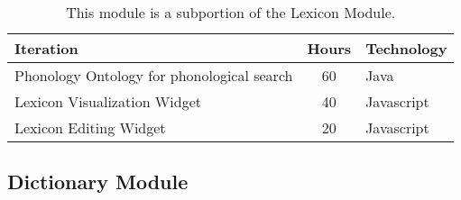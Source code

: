 \documentclass[12 pt]{article}
\begin{document}
\footnotesize
\begin{table}[htbp]
\begin{center}
  \begin{tabular}{ | lcl | }
\hline
Iteration&	Hours&	Technology	\\
\hline
Phonology Ontology for phonological search&	60&	Java	\\ 
Lexicon Visualization Widget&	40&	Javascript	\\ 
Lexicon Editing Widget&	20&	Javascript	\\ 
\hline
  \end{tabular}
 \caption{This module is a subportion of the Lexicon Module.}
  \label{tab:label}
  \end{center}
\end{table}


\newpage
\subsection{Dictionary Module}
\end{document}
